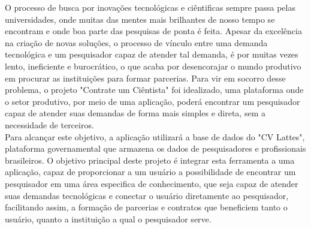 \begin{resumoutfpr}
    O processo de busca por inovações tecnológicas e ciêntificas sempre passa pelas universidades, onde muitas das mentes mais brilhantes de nosso tempo se encontram e onde boa parte das pesquisas de ponta é feita. Apesar da excelência na criação de novas soluções, o processo de vínculo entre uma demanda tecnológica e um pesquisador capaz de atender tal demanda, é por muitas vezes lento, ineficiente e burocrático, o que acaba por desencorajar o mundo produtivo em procurar as instituições para formar parcerias. Para vir em socorro desse problema, o projeto "Contrate um Ciêntista" foi idealizado, uma plataforma onde o setor produtivo, por meio de uma aplicação, poderá encontrar um pesquisador capaz de atender suas demandas de forma mais simples e direta, sem a necessidade de terceiros.
    \\
    Para alcançar este objetivo, a aplicação utilizará a base de dados do "CV Lattes", plataforma governamental que armazena os dados de pesquisadores e profissionais brasileiros. O objetivo principal deste projeto é integrar esta ferramenta a uma aplicação, capaz de proporcionar a um usuário a possibilidade de encontrar um pesquisador em uma área especifica de conhecimento, que seja capaz de atender suas demandas tecnológicas e conectar o usuário diretamente ao pesquisador, facilitando assim, a formação de parcerias e contratos que beneficiem tanto o usuário, quanto a instituição a qual o pesquisador serve.
\end{resumoutfpr}
